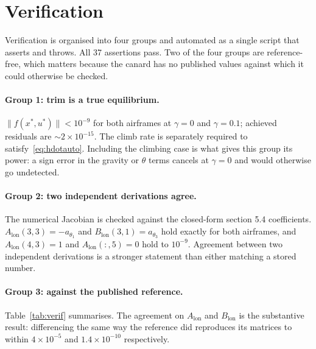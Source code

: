 \documentclass[11pt,a4paper]{article}
\newcommand{\lon}{\mathrm{lon}}
\begin{document}
\section{Verification}\label{sec:verif}

Verification is organised into four groups and automated as a single script that
asserts and throws. All 37 assertions pass. Two of the four groups are
reference-free, which matters because the canard has no published values against
which it could otherwise be checked.

\paragraph{Group 1: trim is a true equilibrium.}
$\lVert f(x^*,u^*)\rVert < 10^{-9}$ for both airframes at $\gamma=0$ and
$\gamma=0.1$; achieved residuals are $\sim\!2\times10^{-15}$. The climb rate is
separately required to satisfy~\eqref{eq:hdotauto}. Including the climbing case is
what gives this group its power: a sign error in the gravity or $\theta$ terms
cancels at $\gamma=0$ and would otherwise go undetected.

\paragraph{Group 2: two independent derivations agree.}
The numerical Jacobian is checked against the closed-form section 5.4
coefficients. $A_\lon(3,3) = -a_{\theta_1}$ and $B_\lon(3,1) = a_{\theta_3}$ hold
exactly for both airframes, and $A_\lon(4,3) = 1$ and $A_\lon(:,5) = 0$ hold to
$10^{-9}$. Agreement between two independent derivations is a stronger statement
than either matching a stored number.

\paragraph{Group 3: against the published reference.}
Table~\ref{tab:verif} summarises. The agreement on $A_\lon$ and $B_\lon$ is the
substantive result: differencing the same way the reference did reproduces its
matrices to within $4\times10^{-5}$ and $1.4\times10^{-10}$ respectively.
\end{document}
